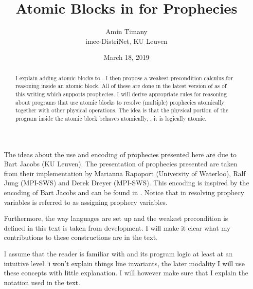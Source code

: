 \documentclass{article}
\title{\bfseries Atomic Blocks in \Iris{} for Prophecies}
\author{Amin Timany\\ {imec-DistriNet, KU Leuven}}
\date{March 18, 2019}
\begin{document}
\maketitle

\begin{abstract}
  I explain adding atomic blocks to \Iris{}. I then propose a weakest
  precondition calculus for reasoning inside an atomic block. All of
  these are done in the latest version of \Iris{} as of this writing
  which supports prophecies. I will derive appropriate rules for
  reasoning about programs that use atomic blocks to resolve
  (multiple) prophecies atomically together with other physical
  operations. The idea is that the physical portion of the program
  inside the atomic block behaves atomically, \ie, it is logically
  atomic.
\end{abstract}

\begin{remark*}
  The ideas about the use and encoding of prophecies presented here
  are due to Bart Jacobs (KU Leuven). The presentation of prophecies
  presented are taken from their implementation by Marianna Rapoport
  (University of Waterloo), Ralf Jung (MPI-SWS) and Derek Dreyer
  (MPI-SWS). This encoding is inspired by the encoding of Bart Jacobs
  and can be found in \citet{KULeuven-2-2363661}. Notice that in
  \loccit resolving prophecy variables is referred to as assigning
  prophecy variables.

  Furthermore, the way languages are set up and the weakest
  precondition is defined in this text is taken from \Iris{}
  \cite{iris, iris2, iris3, irisjfp} development. I will make it clear
  what my contributions to these constructions are in the text.

  I assume that the reader is familiar with \Iris{} and its program
  logic at least at an intuitive level. i won't explain things line
  invariants, the later modality \etc I will use these concepts with
  little explanation. I will however make sure that I explain the
  notation used in the text.
\end{remark*}
\end{document}
